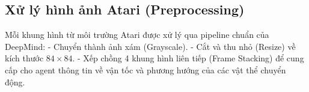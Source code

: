 \subsection{Xử lý hình ảnh Atari (Preprocessing)}
Mỗi khung hình từ môi trường Atari được xử lý qua pipeline chuẩn của DeepMind:
- Chuyển thành ảnh xám (Grayscale).
- Cắt và thu nhỏ (Resize) về kích thước $84 \times 84$.
- Xếp chồng 4 khung hình liên tiếp (Frame Stacking) để cung cấp cho agent thông tin về vận tốc và phương hướng của các vật thể chuyển động.
